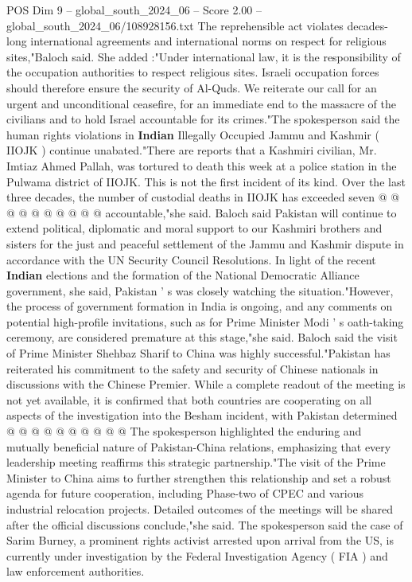 \begin{textsample}{POS Dim 9 – global\_south\_2024\_06 – Score 2.00 – global\_south\_2024\_06/108928156.txt}
The reprehensible act violates decades-long international agreements and international norms on respect for religious sites,"Baloch said.
She added :"Under international law, it is the responsibility of the occupation authorities to respect religious sites.
Israeli occupation forces should therefore ensure the security of Al-Quds.
We reiterate our call for an urgent and unconditional ceasefire, for an immediate end to the massacre of the civilians and to hold Israel accountable for its crimes."The spokesperson said the human rights violations in \textbf{Indian} Illegally Occupied Jammu and Kashmir ( IIOJK ) continue unabated."There are reports that a Kashmiri civilian, Mr.
Imtiaz Ahmed Pallah, was tortured to death this week at a police station in the Pulwama district of IIOJK.
This is not the first incident of its kind.
Over the last three decades, the number of custodial deaths in IIOJK has exceeded seven @ @ @ @ @ @ @ @ @ @ accountable,"she said.
Baloch said Pakistan will continue to extend political, diplomatic and moral support to our Kashmiri brothers and sisters for the just and peaceful settlement of the Jammu and Kashmir dispute in accordance with the UN Security Council Resolutions.
In light of the recent \textbf{Indian} elections and the formation of the National Democratic Alliance government, she said, Pakistan ' s was closely watching the situation."However, the process of government formation in India is ongoing, and any comments on potential high-profile invitations, such as for Prime Minister Modi ' s oath-taking ceremony, are considered premature at this stage,"she said.
Baloch said the visit of Prime Minister Shehbaz Sharif to China was highly successful."Pakistan has reiterated his commitment to the safety and security of Chinese nationals in discussions with the Chinese Premier.
While a complete readout of the meeting is not yet available, it is confirmed that both countries are cooperating on all aspects of the investigation into the Besham incident, with Pakistan determined @ @ @ @ @ @ @ @ @ @ The spokesperson highlighted the enduring and mutually beneficial nature of Pakistan-China relations, emphasizing that every leadership meeting reaffirms this strategic partnership."The visit of the Prime Minister to China aims to further strengthen this relationship and set a robust agenda for future cooperation, including Phase-two of CPEC and various industrial relocation projects.
Detailed outcomes of the meetings will be shared after the official discussions conclude,"she said.
The spokesperson said the case of Sarim Burney, a prominent rights activist arrested upon arrival from the US, is currently under investigation by the Federal Investigation Agency ( FIA ) and law enforcement authorities.

\end{textsample}
